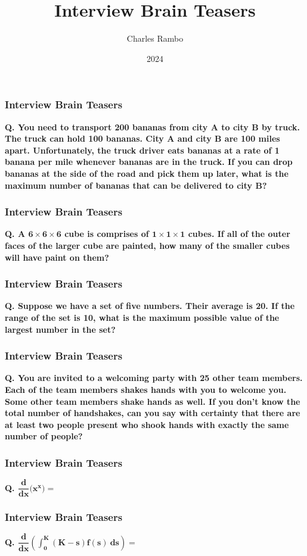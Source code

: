 \documentclass{beamer}
\title{Interview Brain Teasers}
\author{Charles Rambo}
\institute{UCLA Anderson}
\date{2024}
\begin{document}



\begin{frame}[t]
\frametitle{Interview Brain Teasers}
{\bf Q. You need to transport 200 bananas from city A to city B by truck. The truck can hold 100 bananas. City A and city B are 100 miles apart. Unfortunately, the truck driver eats bananas at a rate of 1 banana per mile whenever bananas are in the truck. If you can drop bananas at the side of the road and pick them up later, what is the maximum number of bananas that can be delivered to city B?}

\end{frame}

\begin{frame}[t]
\frametitle{Interview Brain Teasers}
{\bf Q. A $\boldsymbol{6\times 6\times 6}$ cube is comprises of $\boldsymbol{1\times 1\times 1}$ cubes. If all of the outer faces of the larger cube are painted, how many of the smaller cubes will have paint on them?}

\end{frame}

\begin{frame}[t]
\frametitle{Interview Brain Teasers}
{\bf Q. Suppose we have a set of five numbers. Their average is 20. If the range of the set is 10, what is the maximum possible value of the largest number in the set?}

\end{frame}

\begin{frame}[t]
\frametitle{Interview Brain Teasers}
{\bf Q. You are invited to a welcoming party with 25 other team members. Each of the team members shakes hands with you to welcome you. Some other team members shake hands as well. If you don't know the total number of handshakes, can you say with certainty that there are at least two people present who shook hands with exactly the same number of people?}

\end{frame}


\begin{frame}[t]
\frametitle{Interview Brain Teasers}
{\bf Q. $\boldsymbol{\dfrac{d}{dx}\Big(x^x\Big) = }$}

\end{frame}

\begin{frame}[t]
\frametitle{Interview Brain Teasers}
{\bf Q. $\boldsymbol{\dfrac{d}{dx}\left(\displaystyle\int_0^K (K - s) f(s)\ ds\right) = }$}

\end{frame}
\end{document}

